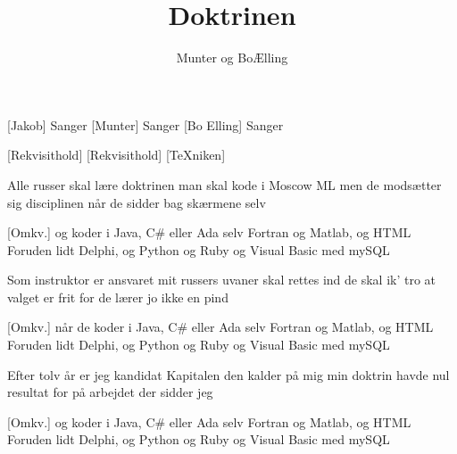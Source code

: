 \documentclass[a4paper,11pt]{article}
\title{Doktrinen}
\author{Munter og BoÆlling}
\begin{document}
\maketitle

\begin{roles}  
[Jakob] Sanger
[Munter] Sanger
[Bo Elling] Sanger
\end{roles}

\begin{props}
[Rekvisithold]
[Rekvisithold]
[TeXniken]
\end{props}

\begin{song}

 Alle russer skal lære doktrinen
man skal kode i Moscow ML
men de modsætter sig disciplinen
når de sidder bag skærmene selv

[Omkv.] og koder i Java, C\# eller Ada
selv Fortran og Matlab, og HTML
Foruden lidt Delphi, og Python og Ruby
og Visual Basic med mySQL

 Som instruktor er ansvaret mit
russers uvaner skal rettes ind
de skal ik' tro at valget er frit
for de lærer jo ikke en pind

[Omkv.] når de koder i Java, C\# eller Ada
selv Fortran og Matlab, og HTML
Foruden lidt Delphi, og Python og Ruby
og Visual Basic med mySQL


 Efter tolv år er jeg kandidat
Kapitalen den kalder på mig
min doktrin havde nul resultat
for på arbejdet der sidder jeg

[Omkv.] og koder i Java, C\# eller Ada
selv Fortran og Matlab, og HTML
Foruden lidt Delphi, og Python og Ruby
og Visual Basic med mySQL

\end{song}
\end{document}
